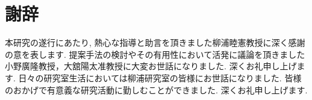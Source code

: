 \chapter*{謝辞}
本研究の遂行にあたり, 熱心な指導と助言を頂きました柳浦睦憲教授に深く感謝の意を表します.
提案手法の検討やその有用性において活発に議論を頂きました小野廣隆教授，大舘陽太准教授に大変お世話になりました. 深くお礼申し上げます.
日々の研究室生活においては柳浦研究室の皆様にお世話になりました.
皆様のおかげで有意義な研究活動に勤しむことができました. 深くお礼申し上げます.

